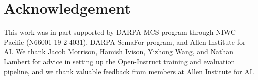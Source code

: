 \section*{Acknowledgement}

This work was in part supported by DARPA MCS program through NIWC Pacific (N66001-19-2-4031), DARPA SemaFor program, and Allen Institute for AI. We thank Jacob Morrison, Hamish Ivison, Yizhong Wang, and Nathan Lambert for advice in setting up the Open-Instruct training and evaluation pipeline, and we thank valuable feedback from members at Allen Institute for AI.
